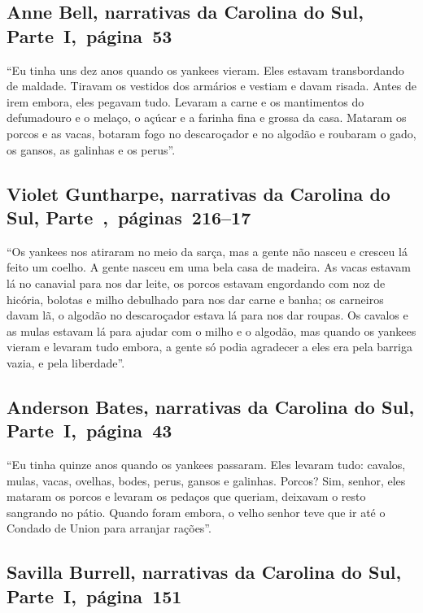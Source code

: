 \subsection{Anne Bell, narrativas da Carolina do Sul, Parte~I,~página~53} \label{ref23}

``Eu tinha uns dez anos quando os yankees vieram. Eles estavam
transbordando de maldade. Tiravam os vestidos dos armários e vestiam e
davam risada. Antes de irem embora, eles pegavam tudo. Levaram a carne e
os mantimentos do defumadouro e o melaço, o açúcar e a farinha fina e
grossa da casa. Mataram os porcos e as vacas, botaram fogo no
descaroçador e no algodão e roubaram o gado, os gansos, as galinhas e os
perus''.

\subsection{Violet Guntharpe, narrativas da Carolina do Sul, Parte~,~páginas~216--17}

``Os yankees nos atiraram no meio da sarça, mas a gente não nasceu e
cresceu lá feito um coelho. A gente nasceu em uma bela casa de madeira.
As vacas estavam lá no canavial para nos dar leite, os porcos estavam
engordando com noz de hicória, bolotas e milho debulhado para nos dar
carne e banha; os carneiros davam lã, o algodão no descaroçador estava
lá para nos dar roupas. Os cavalos e as mulas estavam lá para ajudar com
o milho e o algodão, mas quando os yankees vieram e levaram tudo embora,
a gente só podia agradecer a eles era pela barriga vazia, e pela
liberdade''.

\subsection{Anderson Bates, narrativas da Carolina do Sul, Parte~I,~página~43} \label{ref20}

``Eu tinha quinze anos quando os yankees passaram. Eles levaram tudo:
cavalos, mulas, vacas, ovelhas, bodes, perus, gansos e galinhas. Porcos?
Sim, senhor, eles mataram os porcos e levaram os pedaços que queriam,
deixavam o resto sangrando no pátio. Quando foram embora, o velho senhor
teve que ir até o Condado de Union para arranjar rações''.

\subsection{Savilla Burrell, narrativas da Carolina do Sul, Parte~I,~página~151} \label{ref40}


